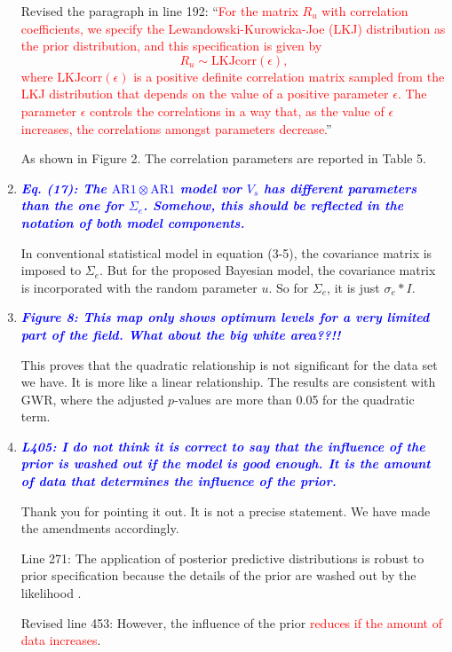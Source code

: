 \documentclass[a4paper]{article}   	%
\newcommand{\AR}{\mathrm{AR}1}
\newcommand{\qtitle}[1]{\textit{\textbf{#1}}}
\begin{document}
\begin{enumerate}
    Revised the paragraph in line 192: ``\textcolor{red}{For the matrix $R_u$ with correlation coefficients, we specify the Lewandowski-Kurowicka-Joe (LKJ) distribution \parencite{Lewandowski2009Generating} as the prior distribution, and this specification is given by
	\begin{equation}\label{eq:RPrior}
		R_u \sim \text{LKJcorr}(\epsilon),
	\end{equation}
	where $\text{LKJcorr}(\epsilon)$ is a positive definite correlation matrix sampled from the LKJ distribution that depends on the value of a positive parameter $\epsilon$. The parameter $\epsilon$ controls the correlations in a way that, as the value of $\epsilon$ increases, the correlations amongst parameters decrease.}''
    
    As shown in Figure 2. The correlation parameters are reported in Table 5.
     

    \item \qtitle{\textcolor{blue}{Eq. (17): The $\AR\otimes \AR$ model vor $V_s$ has different parameters than the one for $\Sigma_e$. Somehow, this should be reflected in the notation of both model components.}}

    In conventional statistical model in equation (3-5), the covariance matrix is imposed to $\Sigma_e$. But for the proposed Bayesian model, the covariance matrix is incorporated with the random parameter $u$. So for $\Sigma_e$, it is just $\sigma_e*I$. 

    \item \qtitle{\textcolor{blue}{Figure 8: This map only shows optimum levels for a very limited part of the field. What about the big white area??!!}}

    This proves that the quadratic relationship is not significant for the data set we have. It is more like a linear relationship. The results are consistent with GWR, where the adjusted $p$-values are more than 0.05 for the quadratic term.

    \item \qtitle{\textcolor{blue}{L405: I do not think it is correct to say that the influence of the prior is washed out if the model is good enough. It is the amount of data that determines the influence of the prior.}}
    
    Thank you for pointing it out. It is not a precise statement. We have made the amendments accordingly. 
    
    Line 271: The application of posterior predictive distributions is robust to prior specification because the details of the prior are washed out by the likelihood \parencite{Gelman2017Prior}.
    
    Revised line 453: However, the influence of the prior \textcolor{red}{reduces if the amount of data increases}.    
    
\end{enumerate}
\end{document}
